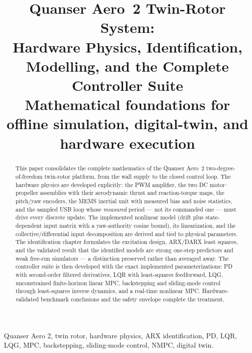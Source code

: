 \documentclass[conference]{IEEEtran}
\begin{document}
\title{Quanser Aero~2 Twin-Rotor System:\\ Hardware Physics, Identification, Modelling, and the Complete Controller Suite\\
{\footnotesize Mathematical foundations for offline simulation, digital-twin, and hardware execution}}

\author{
}

\maketitle

\begin{abstract}
This paper consolidates the complete mathematics of the Quanser Aero~2 two-degree-of-freedom twin-rotor platform, from the wall supply to the closed control loop. The hardware physics are developed explicitly: the PWM amplifier, the two DC motor--propeller assemblies with their aerodynamic thrust and reaction-torque maps, the pitch/yaw encoders, the MEMS inertial unit with measured bias and noise statistics, and the sampled USB loop whose \emph{measured} period --- not its commanded one --- must drive every discrete update. The implemented nonlinear model (drift plus state-dependent input matrix with a yaw-authority cosine bound), its linearization, and the collective/differential input decomposition are derived and tied to physical parameters. The identification chapter formulates the excitation design, ARX/DARX least squares, and the validated result that the identified models are strong one-step predictors and weak free-run simulators --- a distinction preserved rather than averaged away. The controller suite is then developed with the exact implemented parameterizations: PD with second-order filtered derivatives, LQR with least-squares feedforward, LQG, unconstrained finite-horizon linear MPC, backstepping and sliding-mode control through least-squares inverse dynamics, and a real-time nonlinear MPC. Hardware-validated benchmark conclusions and the safety envelope complete the treatment.
\end{abstract}

\begin{IEEEkeywords}
Quanser Aero 2, twin rotor, hardware physics, ARX identification, PD, LQR, LQG, MPC, backstepping, sliding-mode control, NMPC, digital twin.
\end{IEEEkeywords}
\end{document}
